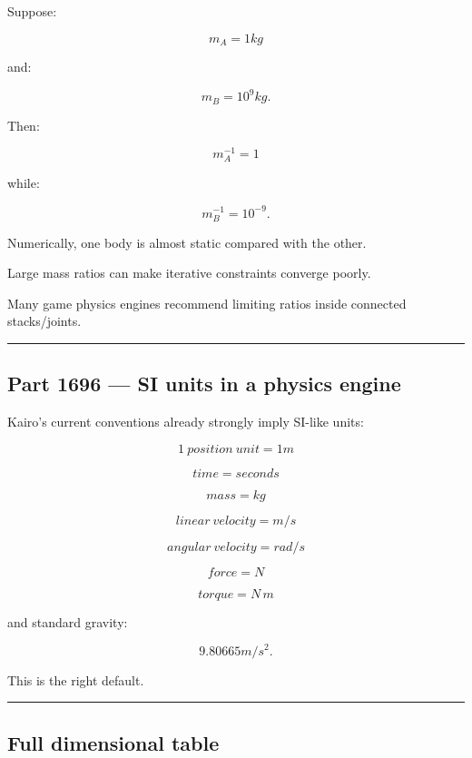 \hypertarget{06-engine-ii-ch039-mass-ratios}{}

Suppose:

\[
m_A=1kg
\]

and:

\[
m_B=10^9kg.
\]

Then:

\[
m_A^{-1}=1
\]

while:

\[
m_B^{-1}=10^{-9}.
\]

Numerically, one body is almost static compared with the other.

Large mass ratios can make iterative constraints converge poorly.

Many game physics engines recommend limiting ratios inside connected stacks/joints.

\begin{center}\rule{0.5\linewidth}{0.5pt}\end{center}

\subsection{Part 1696 --- SI units in a physics engine}\label{06-engine-ii-ch039-part-1696-si-units-in-a-physics-engine}

\hypertarget{06-engine-ii-ch039-part-1696-si-units-in-a-physics-engine}{}

Kairo's current conventions already strongly imply SI-like units:

\[
\boxed{
1\ position\ unit=1m
}
\]

\[
\boxed{
time=seconds
}
\]

\[
\boxed{
mass=kg
}
\]

\[
\boxed{
linear\ velocity=m/s
}
\]

\[
\boxed{
angular\ velocity=rad/s
}
\]

\[
\boxed{
force=N
}
\]

\[
\boxed{
torque=N\,m
}
\]

and standard gravity:

\[
9.80665m/s^2.
\]

This is the right default.

\begin{center}\rule{0.5\linewidth}{0.5pt}\end{center}

\subsection{Full dimensional table}\label{06-engine-ii-ch039-full-dimensional-table}

